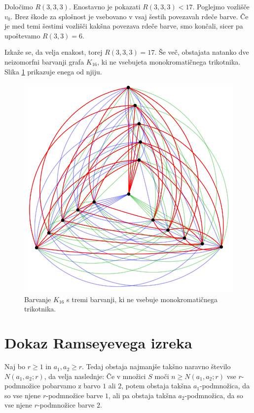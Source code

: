 \documentclass[twoside,11pt]{article}
\begin{document}
\begin{zgled}
    Določimo $R(3, 3, 3)$.
    Enostavno je pokazati $R(3,3,3) < 17$. Poglejmo vozlišče $v_0$. Brez škode za splošnost je vsebovano v vsaj šestih povezavah rdeče 
    barve. Če je med temi šestimi vozlišči kakšna povezava rdeče barve, smo končali, 
    sicer pa upoštevamo $R(3, 3) = 6$.

    Izkaže se, da velja enakost, torej $R(3, 3, 3) = 17$. Še več, obstajata natanko dve 
    neizomorfni barvanji grafa $K_{16}$, ki ne vsebujeta monokromatičnega trikotnika.
    Slika \ref{fig:r333} prikazuje enega od njiju.
    \begin{figure}[h!]
        \centering
        \includegraphics[scale=0.3]{r333.png}
        \caption{Barvanje $K_{16}$ s tremi barvanji, ki ne vsebuje monokromatičnega trikotnika. \cite{r333}}
        \label{fig:r333}
    \end{figure}
\end{zgled}

\section{Dokaz Ramseyevega izreka}

\begin{izrek}[Ramsey]
    Naj bo $r \ge 1$ in $a_1, a_2 \ge r$. Tedaj obstaja najmanjše takšno naravno število 
    $N(a_1, a_2; r)$, da velja naslednje: Če v množici $S$ moči $n \ge N(a_1, a_2; r)$
    vse $r$-podmnožice pobarvamo z barvo $1$ ali $2$, potem obstaja takšna $a_1$-podmnožica, 
    da so vse njene $r$-podmnožice barve $1$, ali pa obstaja takšna $a_2$-podmnožica, da so 
    vse njene $r$-podmnožice barve $2$. \label{izrek:ramsey}
\end{izrek}
\end{document}
